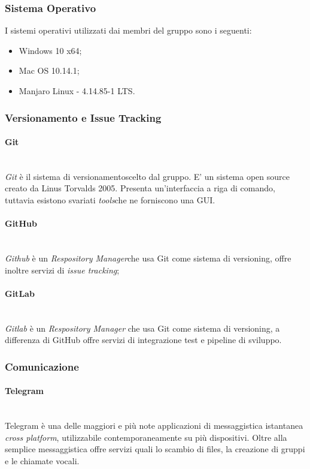 \subsubsection{Sistema Operativo}
	I sistemi operativi utilizzati dai membri del gruppo sono i seguenti:
	\begin{itemize}
	\item Windows 10 x64;
	\item Mac OS 10.14.1;
	\item Manjaro Linux - 4.14.85-1 LTS.
	\end{itemize}

\subsubsection{Versionamento e Issue Tracking}

\paragraph{Git} ~\\
	\textit{Git} è il sistema di versionamento\glossario scelto dal gruppo. E' un sistema open source creato da Linus 	Torvalds 2005. Presenta un'interfaccia a riga di comando, tuttavia esistono svariati \textit{tools}\glossario 	che 	ne forniscono una GUI.

\paragraph{GitHub} ~\\
	\textit{Github} è un \textit{Respository Manager}\glossario che usa Git come sistema di versioning, offre inoltre 	servizi di \textit{issue tracking}\glossario;
	
\paragraph{GitLab} \-\\
	\textit{Gitlab} è un \textit{Respository Manager} che usa Git come sistema di versioning, a differenza di GitHub offre servizi di integrazione test e pipeline di sviluppo. 

\subsubsection{Comunicazione}

\paragraph{Telegram} ~\\
	Telegram è una delle maggiori e più note applicazioni di messaggistica istantanea \textit{cross platform}, 					utilizzabile contemporaneamente su più dispositivi. Oltre alla semplice messaggistica offre servizi quali lo 				scambio di files, la creazione di gruppi e le chiamate vocali.

